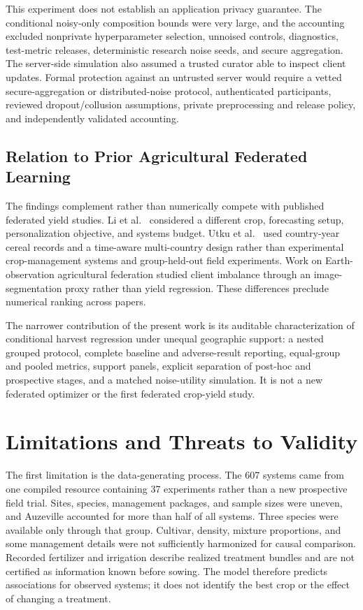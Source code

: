 \documentclass[journal]{IEEEtran}
\begin{document}
This experiment does not establish an application privacy guarantee. The
conditional noisy-only composition bounds were very large, and the accounting
excluded nonprivate hyperparameter selection, unnoised controls, diagnostics,
test-metric releases, deterministic research noise seeds, and secure aggregation.
The server-side simulation also assumed a trusted curator able to inspect client
updates. Formal protection against an untrusted server would require a vetted
secure-aggregation or distributed-noise protocol, authenticated participants,
reviewed dropout/collusion assumptions, private preprocessing and release policy,
and independently validated accounting.

\subsection{Relation to Prior Agricultural Federated Learning}

The findings complement rather than numerically compete with published federated
yield studies. Li et al.\ \cite{li2024pruning} considered a different crop,
forecasting setup, personalization objective, and systems budget. Utku et al.\
\cite{utku2026forecasting} used country-year cereal records and a time-aware
multi-country design rather than experimental crop-management systems and
group-held-out field experiments. Work on Earth-observation agricultural
federation \cite{cowlishaw2025balancing} studied client imbalance through an
image-segmentation proxy rather than yield regression. These differences
preclude numerical ranking across papers.

The narrower contribution of the present work is its auditable characterization
of conditional harvest regression under unequal geographic support: a nested
grouped protocol, complete baseline and adverse-result reporting, equal-group
and pooled metrics, support panels, explicit separation of post-hoc and
prospective stages, and a matched noise-utility simulation. It is not a new
federated optimizer or the first federated crop-yield study.

\section{Limitations and Threats to Validity}

The first limitation is the data-generating process. The 607 systems came from
one compiled resource \cite{gaudio2024cereallegume} containing 37 experiments
rather than a new prospective field trial. Sites, species, management packages,
and sample sizes were uneven, and Auzeville accounted for more than half of all
systems. Three species were available only through that group. Cultivar, density,
mixture proportions, and some management details were not sufficiently harmonized
for causal comparison. Recorded fertilizer and irrigation describe realized
treatment bundles and are not certified as information known before sowing. The
model therefore predicts associations for observed systems; it does not identify
the best crop or the effect of changing a treatment.
\end{document}
